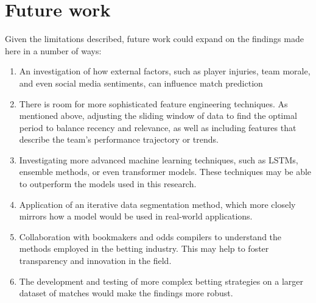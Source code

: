 \section{Future work}

Given the limitations described, future work could expand on the findings made here in a number of ways:

\begin{enumerate}
	\item An investigation of how external factors, such as player injuries, team morale, and even social media sentiments, can influence match prediction
	\item There is room for more sophisticated feature engineering techniques. As mentioned above, adjusting the sliding window of data to find the optimal period to balance recency and relevance, as well as including features that describe the team's performance trajectory or trends.
	\item Investigating more advanced machine learning techniques, such as LSTMs, ensemble methods, or even transformer models. These techniques may be able to outperform the models used in this research.
	\item Application of an iterative data segmentation method, which more closely mirrors how a model would be used in real-world applications.
	\item Collaboration with bookmakers and odds compilers to understand the methods employed in the betting industry. This may help to foster transparency and innovation in the field.
	\item The development and testing of more complex betting strategies on a larger dataset of matches would make the findings more robust.
\end{enumerate}
